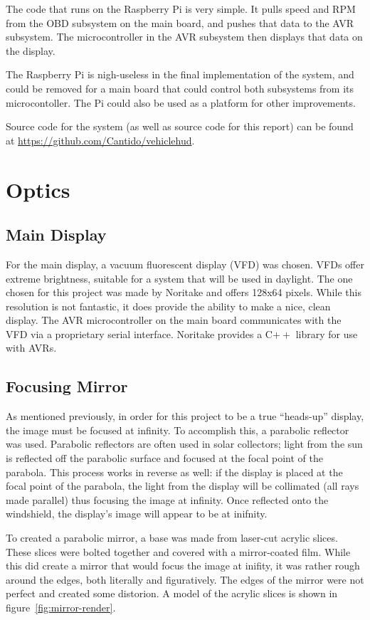 The code that runs on the Raspberry Pi is very simple. It pulls speed and RPM
from the OBD subsystem on the main board, and pushes that data to the AVR
subsystem. The microcontroller in the AVR subsystem then displays that data
on the display.

The Raspberry Pi is nigh-useless in the final implementation of the system, and
could be removed for a main board that could control both subsystems from its
microcontoller. The Pi could also be used as a platform for other improvements.

Source code for the system (as well as source code for this report) can be
found at \url{https://github.com/Cantido/vehiclehud}.

\section{Optics}
\subsection{Main Display}
For the main display, a vacuum fluorescent display (VFD) was chosen.  VFDs offer
extreme brightness, suitable for a system that will be used in daylight.  The
one chosen for this project was made by Noritake and offers 128x64 pixels.  
While this resolution is not fantastic, it does provide the ability to make a
nice, clean display.  The AVR microcontroller on the main board communicates 
with the VFD via a proprietary serial interface.  Noritake provides a C$++$ 
library for use with AVRs.

\subsection{Focusing Mirror}
As mentioned previously, in order for this project to be a true ``heads-up'' 
display, the image must be focused at infinity.  To accomplish this, a 
parabolic reflector was used.  Parabolic reflectors are often used in solar
collectors; light from the sun is reflected off the parabolic surface and
focused at the focal point of the parabola.  This process works in reverse 
as well: if the display is placed at the focal point of the parabola, the
light from the display will be collimated (all rays made parallel) thus
focusing the image at infinity.  Once reflected onto the windshield, the
display's image will appear to be at inifnity.

To created a parabolic mirror, a base was made from laser-cut acrylic slices.
These slices were bolted together and covered with a mirror-coated film.  While
this did create a mirror that would focus the image at inifity, it was rather
rough around the edges, both literally and figuratively.  The edges of the mirror
were not perfect and created some distorion.  A model of the acrylic slices is 
shown in figure~\ref{fig:mirror-render}.

